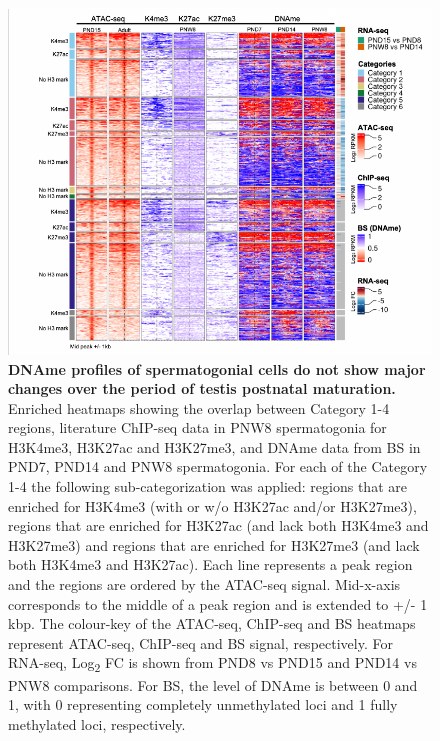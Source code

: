 \documentclass[12pt,twoside]{reedthesis}
\begin{document}
\begin{figure}[htbp]

{\centering \includegraphics{thesis_files/figure-latex/ds4-1} 

}

\caption[DNAme profiles of spermatogonial cells do not show major changes over the period of testis postnatal maturation]{\textbf{DNAme profiles of spermatogonial cells do not show major changes over the period of testis postnatal maturation.} Enriched heatmaps showing the overlap between Category 1-4 regions, literature ChIP-seq data in PNW8 spermatogonia for H3K4me3, H3K27ac and H3K27me3, and DNAme data from BS in PND7, PND14 and PNW8 spermatogonia. For each of the Category 1-4 the following sub-categorization was applied: regions that are enriched for H3K4me3 (with or w/o H3K27ac and/or H3K27me3), regions that are enriched for H3K27ac (and lack both H3K4me3 and H3K27me3) and regions that are enriched for H3K27me3 (and lack both H3K4me3 and H3K27ac). Each line represents a peak region and the regions are ordered by the ATAC-seq signal. Mid-x-axis corresponds to the middle of a peak region and is extended to +/- 1 kbp. The colour-key of the ATAC-seq, ChIP-seq and BS heatmaps represent ATAC-seq, ChIP-seq and BS signal, respectively. For RNA-seq, Log\textsubscript{2} FC is shown from PND8 vs PND15 and PND14 vs PNW8 comparisons. For BS, the level of DNAme is between 0 and 1, with 0 representing completely unmethylated loci and 1 fully methylated loci, respectively.}\label{fig:ds4}
\end{figure}
\end{document}
